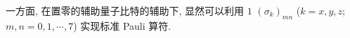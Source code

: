 \documentclass{assignment}
\begin{document}
\begin{sol}

    一方面, 在置零的辅助量子比特的辅助下, 显然可以利用 $1$ $(\sigma_k)_{mn}$ ($k=x,y,z$; $m,n=0,1,\cdots,7$) 实现标准 Pauli 算符.


\end{sol}
\end{document}
